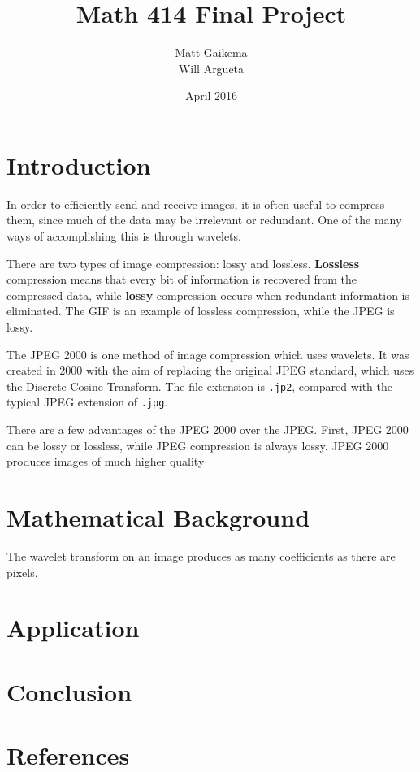 \documentclass{article}
\title{Math 414 Final Project}
\author{Matt Gaikema \\ Will Argueta}
\date{April 2016}
\begin{document}
\maketitle

\section{Introduction}

In order to efficiently send and receive images, it is often useful to compress them, 
since much of the data may be irrelevant or redundant.
One of the many ways of accomplishing this is through wavelets.

There are two types of image compression: lossy and lossless.
\textbf{Lossless} compression means that every bit of information is recovered from the compressed data,
while \textbf{lossy} compression occurs when redundant information is eliminated.
The GIF is an example of lossless compression, while the JPEG is lossy.

The JPEG 2000 is one method of image compression which uses wavelets.
It was created in 2000 with the aim of replacing the original JPEG standard, which uses the Discrete Cosine Transform.
The file extension is \verb|.jp2|, compared with the typical JPEG extension of \verb|.jpg|.

There are a few advantages of the JPEG 2000 over the JPEG.
First, JPEG 2000 can be lossy or lossless, while JPEG compression is always lossy.
JPEG 2000 produces images of much higher quality


\section{Mathematical Background}

The wavelet transform on an image produces as many coefficients as there are pixels.


\section{Application}


\section{Conclusion}


\section{References}
\end{document}
